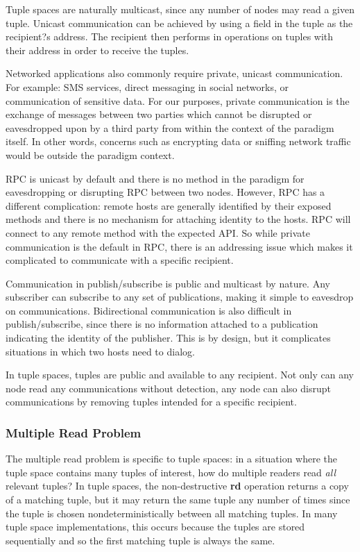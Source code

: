 Tuple spaces are naturally multicast, since any number of nodes may read a given tuple. Unicast communication can be achieved by using a field in the tuple as the recipient?s address. The recipient then performs in operations on tuples with their address in order to receive the tuples.

Networked applications also commonly require private, unicast communication. For example: SMS services, direct messaging in social networks, or communication of sensitive data. For our purposes, private communication is the exchange of messages between two parties which cannot be disrupted or eavesdropped upon by a third party from within the context of the paradigm itself. In other words, concerns such as encrypting data or sniffing network traffic would be outside the paradigm context.

RPC is unicast by default and there is no method in the paradigm for eavesdropping or disrupting RPC between two nodes. However, RPC has a different complication: remote hosts are generally identified by their exposed methods and there is no mechanism for attaching identity to the hosts. RPC will connect to any remote method with the expected API. So while private communication is the default in RPC, there is an addressing issue which makes it complicated to communicate with a specific recipient.

Communication in publish/subscribe is public and multicast by nature. Any subscriber can subscribe to any set of publications, making it simple to eavesdrop on communications. Bidirectional communication is also difficult in publish/subscribe, since there is no information attached to a publication indicating the identity of the publisher. This is by design, but it complicates situations in which two hosts need to dialog.

In tuple spaces, tuples are public and available to any recipient. Not only can any node read any communications without detection, any node can also disrupt communications by removing tuples intended for a specific recipient.

\subsubsection{Multiple Read Problem}

The multiple read problem \cite{mrdp} is specific to tuple spaces: in a situation where the tuple space contains many tuples of interest, how do multiple readers read \textit{all} relevant tuples? In tuple spaces, the non-destructive \textbf{rd} operation returns a copy of a matching tuple, but it may return the same tuple any number of times since the tuple is chosen nondeterministically between all matching tuples. In many tuple space implementations, this occurs because the tuples are stored sequentially and so the first matching tuple is always the same\cite{de2012new}.

